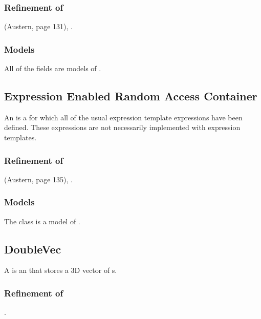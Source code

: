 \documentclass[11pt]{rnote}
\begin{document}
\subsubsection{Refinement of}
 (Austern, page 131), .

\subsubsection{Models}

All of the  fields are models of .

\subsection{Expression Enabled Random Access Container}

An  is a
 for which all of the usual
expression template expressions have been defined. These expressions
are not necessarily implemented with expression templates.

\subsubsection{Refinement of}
 (Austern, page 135),
.

\subsubsection{Models}

The  class is a model of
.

\subsection{DoubleVec}

A  is an  that stores a 3D vector of s.

\subsubsection{Refinement of}
.
\end{document}
